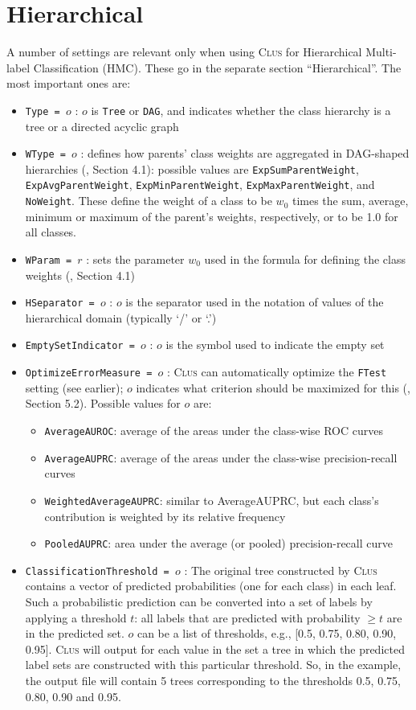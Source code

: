 \documentclass[a4paper]{report}
\newcommand{\clus}{\textsc{Clus}}
\begin{document}
%
\section{Hierarchical}

A number of settings are relevant only when using \clus{} for Hierarchical Multi-label Classification (HMC).  These go in the separate section ``Hierarchical''.  The most important ones are:

\begin{itemize}
\item {\tt Type = $o$} : $o$ is {\tt Tree} or {\tt DAG}, and indicates whether the class hierarchy is a tree or a directed acyclic graph \cite{Vens08:jrnl}
\item {\tt WType = $o$} : defines how parents' class weights are aggregated in DAG-shaped hierarchies (\cite{Vens08:jrnl}, Section 4.1): possible values are {\tt ExpSumParentWeight}, {\tt ExpAvgParentWeight}, {\tt ExpMinParentWeight}, {\tt ExpMaxParentWeight}, and {\tt NoWeight}.  These define the weight of a class to be $w_0$ times the sum, average, minimum or maximum of the parent's weights, respectively, or to be 1.0 for all classes. 
\item {\tt WParam = $r$} : sets the parameter $w_0$ used in the formula for defining the class weights (\cite{Vens08:jrnl}, Section 4.1)
\item {\tt HSeparator = $o$} : $o$ is the separator used in the notation of values of the hierarchical domain (typically `/' or `.') 
\item {\tt EmptySetIndicator = $o$} : $o$ is the symbol used to indicate the empty set
\item {\tt OptimizeErrorMeasure = $o$} : \clus{} can automatically optimize the {\tt FTest} setting (see earlier); $o$ indicates what criterion should be maximized for this (\cite{Vens08:jrnl}, Section 5.2).  Possible values for $o$ are:
  \begin{itemize}
   \item {\tt AverageAUROC}: average of the areas under the class-wise ROC curves
   \item {\tt AverageAUPRC}: average of the areas under the class-wise precision-recall curves
   \item {\tt WeightedAverageAUPRC}: similar to AverageAUPRC, but each class's contribution is weighted by its relative frequency
   \item {\tt PooledAUPRC}: area under the average (or pooled) precision-recall curve
  \end{itemize}
\item {\tt ClassificationThreshold = $o$} : The original tree constructed by \clus{} contains a vector of predicted probabilities (one for each class) in each leaf. Such a probabilistic prediction can be converted into a set of labels by applying a threshold $t$: all labels that are predicted with probability $\geq t$ are in the predicted set.  $o$ can be a list of thresholds, e.g., [0.5, 0.75, 0.80, 0.90, 0.95]. \clus{} will output for each value in the set a tree in which the predicted label sets are constructed with this particular threshold. So, in the example, the output file will contain 5 trees corresponding to the thresholds 0.5, 0.75, 0.80, 0.90 and 0.95.


\end{itemize}
\end{document}
